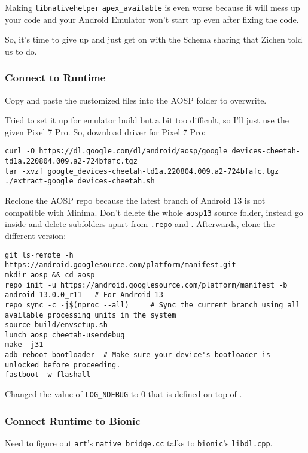 Making \texttt{libnativehelper} \texttt{apex\_available} is even worse because it will mess up your code and your Android Emulator won't start up even after fixing the code.

So, it's time to give up and just get on with the Schema sharing that Zichen told us to do.

\subsubsection{Connect to Runtime}

Copy and paste the customized files into the AOSP folder to overwrite.

Tried to set it up for emulator build but a bit too difficult, so I'll just use the given Pixel 7 Pro. So, download driver for Pixel 7 Pro: 
\begin{lstlisting}
curl -O https://dl.google.com/dl/android/aosp/google_devices-cheetah-td1a.220804.009.a2-724bfafc.tgz
tar -xvzf google_devices-cheetah-td1a.220804.009.a2-724bfafc.tgz
./extract-google_devices-cheetah.sh
\end{lstlisting}

Reclone the AOSP repo because the latest branch of Android 13 is not compatible with Minima. Don't delete the whole \texttt{aosp13} source folder, instead go inside and delete subfolders apart from \texttt{.repo} and \texttt{}. Afterwards, clone the different version:
\begin{lstlisting}
git ls-remote -h https://android.googlesource.com/platform/manifest.git
mkdir aosp && cd aosp
repo init -u https://android.googlesource.com/platform/manifest -b android-13.0.0_r11   # For Android 13
repo sync -c -j$(nproc --all)     # Sync the current branch using all available processing units in the system
source build/envsetup.sh
lunch aosp_cheetah-userdebug
make -j31
adb reboot bootloader  # Make sure your device's bootloader is unlocked before proceeding.
fastboot -w flashall
\end{lstlisting}

Changed the value of \texttt{LOG\_NDEBUG} to $0$ that is defined on top of .

\subsubsection{Connect Runtime to Bionic}

Need to figure out \texttt{art}'s \texttt{native\_bridge.cc} talks to \texttt{bionic}'s \texttt{libdl.cpp}.

